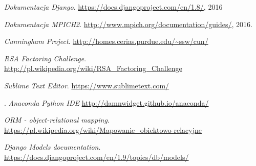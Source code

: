 \documentclass{article}
\begin{document}
\newpage
\begin{thebibliography}{9}
	\emph{Dokumentacja Django}.
	\url{https://docs.djangoproject.com/en/1.8/},
	2016

	\emph{Dokumentacja MPICH2}.
  	\url{http://www.mpich.org/documentation/guides/},
  	2016.

	\emph{Cunningham Project}.
	\url{http://homes.cerias.purdue.edu/~ssw/cun/}

	\emph{RSA Factoring Challenge}.
	\url{http://pl.wikipedia.org/wiki/RSA_Factoring_Challenge}

  \emph{Sublime Text Editor}.
  \url{https://www.sublimetext.com/}

.
  \emph{Anaconda Python IDE}
  \url{http://damnwidget.github.io/anaconda/}

  \emph{ORM - object-relational mapping}.
  \url{https://pl.wikipedia.org/wiki/Mapowanie_obiektowo-relacyjne}

  \emph{Django Models documentation}.
  \url{https://docs.djangoproject.com/en/1.9/topics/db/models/}

\end{thebibliography}
\end{document}
